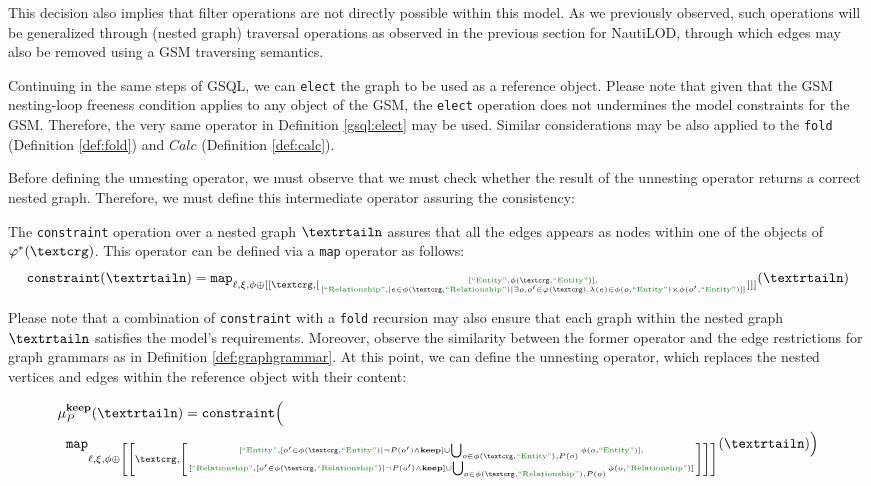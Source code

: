 This decision also implies that filter operations are not directly possible within this model. As we previously observed, such operations will be generalized through (nested graph) traversal operations as observed in the previous section for NautiLOD, through which edges may also be removed using a GSM traversing semantics. %


Continuing in the same steps of GSQL, we can \texttt{elect} the graph to be  used as a reference object. Please note that given that the GSM nesting-loop freeness condition applies to any object of the GSM, the \texttt{elect} operation does not undermines the model constraints for the GSM. Therefore, the very same operator in Definition \vref{gsql:elect} may be used. 
Similar considerations may be also applied to the \texttt{fold}  (Definition \vref{def:fold}) and $Calc$ (Definition \vref{def:calc}).

Before defining the unnesting operator, we must observe that we must check whether the result of the unnesting operator returns a correct nested graph. Therefore, we must define this intermediate operator assuring the consistency:

\begin{definition}
	The \texttt{constraint} operation over a nested graph $\nested$ assures that all the edges appears as nodes within one of the objects of $\varphi^*(\ngraph)$. This operator can be defined via a \texttt{map} operator as follows:
	\[\texttt{constraint}(\nested)=\texttt{map}_{\ell,\xi,\phi\oplus [[\ngraph,[\genfrac{}{}{0pt}{}{[\ONTA,\phi(\ngraph,\ONTA)],}{[\RELA,[e\in\phi(\ngraph,\RELA)|\exists o,o'\in \varphi(\ngraph).\lambda(e)\in\phi(o,\ONTA)\times\phi(o',\ONTA) ]]}]]]}(\nested)\]
\end{definition}

Please note that a combination of \texttt{constraint} with a \texttt{fold} recursion may also ensure that each graph within the nested graph $\nested$ satisfies the model's requirements. Moreover, observe the similarity between the former operator and the edge restrictions for graph grammars as in Definition \vref{def:graphgrammar}. At this point, we can define the unnesting operator, which replaces the nested vertices and edges within the reference object with their content:

\[\begin{split}
{\mu}&{}_{P}^{\textbf{keep}}(\nested)=\texttt{constraint}\Big(\\
&\texttt{map}_{\ell,\xi,\phi\oplus \left[\left[\ngraph,\left[\genfrac{}{}{0pt}{}{[\ONTA,[o'\in\phi(\ngraph,\ONTA)|\neg P(o')\wedge \textbf{keep}]\cup\bigcup_{o\in\phi(\ngraph,\ONTA),P(o)}\phi(o,\ONTA)],}{[\RELA,[o'\in\phi(\ngraph,\RELA)|\neg P(o')\wedge \textbf{keep}]\cup\bigcup_{o\in\phi(\ngraph,\RELA),P(o)}\phi(o,\RELA)]}\right]\right]\right]}(\nested)\Big)\\
\end{split}\]

